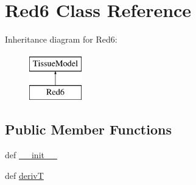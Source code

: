 \hypertarget{classcell__mdl_1_1_red6}{
\section{Red6 Class Reference}
\label{classcell__mdl_1_1_red6}
}
Inheritance diagram for Red6:\begin{figure}[H]
\begin{center}
\leavevmode
\includegraphics[height=2cm]{classcell__mdl_1_1_red6}
\end{center}
\end{figure}
\subsection*{Public Member Functions}
\begin{DoxyCompactItemize}
\item 
def \hyperlink{classcell__mdl_1_1_red6_ac775ee34451fdfa742b318538164070e}{\_\-\_\-init\_\-\_\-}
\item 
def \hyperlink{classcell__mdl_1_1_red6_ad67701a6bb599a16a9eb386aa1cd4328}{derivT}
\end{DoxyCompactItemize}
